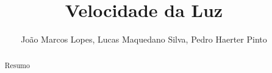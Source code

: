 \documentclass[a4paper,10pt]{report}
\author{João Marcos Lopes, Lucas Maquedano Silva, Pedro Haerter Pinto}
\title{Velocidade da Luz}
\begin{document}
\maketitle
\tableofcontents

\begin{abstract}
Resumo
\end{abstract}
\end{document}
